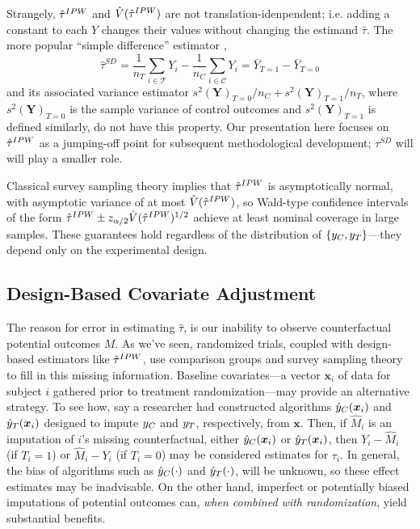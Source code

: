 Strangely, $\hat{\tau}^{IPW}$ and $\hat{V}(\hat{\tau}^{IPW})$ are not translation-idenpendent;
i.e. adding a constant to each $Y$ changes their values without
changing the estimand $\bar{\tau}$.
The more popular ``simple difference'' estimator \citep{neyman:1923},
\begin{equation}\label{eq:tauSD}
\hat{\tau}^{SD} = \frac{1}{n_T}\sum_{i \in \mathcal{T}}Y_i - \frac{1}{n_C}\sum_{i \in \mathcal{C}}Y_i=\bar{Y}_{T=1}-\bar{Y}_{T=0}
\end{equation}
and its associated variance estimator
$s^2(\bm{Y})_{T=0}/n_C+s^2(\bm{Y})_{T=1}/n_T$, where
$s^2(\bm{Y})_{T=0}$ is the sample variance of control outcomes
and
$s^2(\bm{Y})_{T=1}$ is defined similarly, do not have this property.
Our presentation here focuses on $\hat{\tau}^{IPW}$ as a jumping-off point for
subsequent methodological development;
$\tau^{SD}$ will will play a smaller role.


Classical survey sampling theory implies that $\hat{\tau}^{IPW}$ is
asymptotically normal, with asymptotic variance of at most
$\hat{V}(\hat{\tau}^{IPW})$, so Wald-type confidence intervals of the form
$\hat{\tau}^{IPW}\pm z_{\alpha/2}\hat{V}(\hat{\tau}^{IPW})^{1/2}$ achieve at least nominal coverage
in large samples.
These guarantees hold regardless of the distribution of
$\{y_C,y_T\}$---they depend only on the experimental design.



\subsection{Design-Based Covariate Adjustment}

The reason for error in estimating $\hat{\tau}$, is our inability to observe counterfactual
potential outcomes $M$.
As we've seen, randomized trials, coupled with design-based estimators
like $\hat{\tau}^{IPW}$, use comparison groups and survey sampling theory to
fill in this missing information.
Baseline covariates---a vector $\bm{x}_i$ of data for subject $i$
gathered prior to treatment randomization---may provide an alternative
strategy.
To see how, say a researcher had constructed algorithms $\hat{y}_C(\bm{x}_i)$ and
$\hat{y}_T(\bm{x}_i)$ designed to impute $y_C$ and $y_T$, respectively, from
$\bm{x}$.
Then, if $\hat{M}_i$ is an imputation of $i$'s missing counterfactual,
either $\hat{y}_C(\bm{x}_i)$ or $\hat{y}_T(\bm{x}_i)$, then $Y_i-\hat{M}_i$ (if $T_i=1$) or $\hat{M}_i-Y_i$ (if $T_i=0$)
may be considered estimates for $\tau_i$.
In general, the bias of algorithms such as $\hat{y}_C(\cdot)$ and
$\hat{y}_T(\cdot)$, will be unknown, so these effect estimates may be inadvisable.
On the other hand, imperfect or potentially biased imputations of
potential outcomes can, \emph{when combined with randomization}, yield
substantial benefits.

